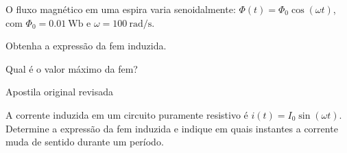 \blocoaprofundamento
\begin{questao}[3]{}

O fluxo magnético em uma espira varia senoidalmente:
$\Phi(t) = \Phi_0\cos(\omega t)$, com $\Phi_0 = \SI{0.01}{\weber}$ e
$\omega = \SI{100}{\radian\per\second}$.
\begin{itensq}
\item Obtenha a expressão da fem induzida.
\item Qual é o valor máximo da fem?
\end{itensq}


\end{questao}
\begin{questao}[3]{Apostila original revisada}

A corrente induzida em um circuito puramente resistivo é
$i(t)=I_0\sin(\omega t)$. Determine a expressão da fem induzida e indique em quais
instantes a corrente muda de sentido durante um período.


\end{questao}

